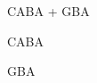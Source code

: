 \documentclass[a4paper, 10pt]{article}
\begin{document}
				\begin{figure}[H]
    				\centering
    				\caption{CABA + GBA}
				\end{figure}
				\begin{figure}[H]
    				\centering
    				\caption{CABA}
				\end{figure}
				\begin{figure}[H]
    				\centering
    				\caption{GBA}
				\end{figure}
				
\end{document}
